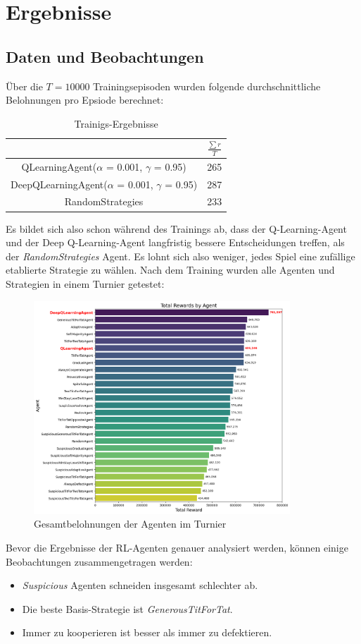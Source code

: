 \chapter{Ergebnisse}
\section{Daten und Beobachtungen}
Über die $T = 10000$ Trainingsepisoden wurden folgende durchschnittliche Belohnungen pro Epsiode berechnet:
\begin{table}[H]
    \centering
    \begin{tabular}{c|c}
            & $\frac{\sum r}{T}$ \\
        \hline
        QLearningAgent($\alpha$ = 0.001, $\gamma$ = 0.95)  & 265 \\
        \hline
        DeepQLearningAgent($\alpha$ = 0.001, $\gamma$ = 0.95) & 287 \\
        \hline
        RandomStrategies & 233
    \end{tabular}
    \caption{Trainigs-Ergebnisse}
    \label{table:trainingsergebnisse}
\end{table}
Es bildet sich also schon während des Trainings ab, dass der Q-Learning-Agent und der Deep Q-Learning-Agent langfristig
bessere Entscheidungen treffen, als der \textit{RandomStrategies} Agent. Es lohnt sich also weniger, jedes Spiel
eine zufällige etablierte Strategie zu wählen.
Nach dem Training wurden alle Agenten und Strategien in einem Turnier getestet:
\begin{figure}[H]
    \centering
    \includegraphics[height=8cm]{../poster/logos/tournament.png}
    \caption{Gesamtbelohnungen der Agenten im Turnier}
    \label{fig:gesamtbelohnungen}
\end{figure}
Bevor die Ergebnisse der RL-Agenten genauer analysiert werden, können einige Beobachtungen zusammengetragen werden:
\begin{itemize}
    \item \textit{Suspicious} Agenten schneiden insgesamt schlechter ab.
    \item Die beste Basis-Strategie ist \textit{GenerousTitForTat}.
    \item Immer zu kooperieren ist besser als immer zu defektieren.
\end{itemize}

